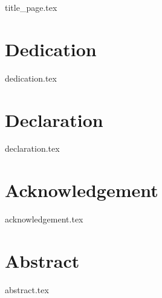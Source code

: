 \documentclass[12pt, openany]{book}
\begin{document}
\frontmatter

{title_page.tex}

\chapter{Dedication}
{dedication.tex}

\chapter{Declaration}
{declaration.tex}

\chapter{Acknowledgement}
{acknowledgement.tex}

\chapter{Abstract}
{abstract.tex}
\end{document}
